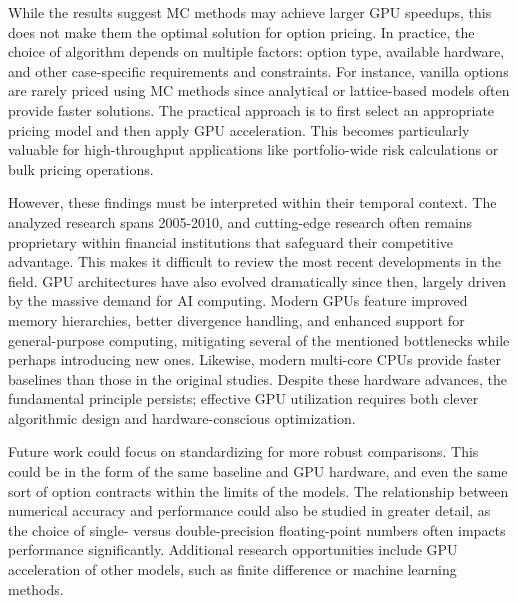\documentclass[english,12pt,a4paper,pdftex,sci,utf8]{aaltothesis}
\begin{document}
While the results suggest MC methods may achieve larger GPU speedups, this does not make them the optimal solution for option pricing. In practice, the choice of algorithm depends on multiple factors: option type, available hardware, and other case-specific requirements and constraints. For instance, vanilla options are rarely priced using MC methods since analytical or lattice-based models often provide faster solutions. The practical approach is to first select an appropriate pricing model and then apply GPU acceleration. This becomes particularly valuable for high-throughput applications like portfolio-wide risk calculations or bulk pricing operations.

However, these findings must be interpreted within their temporal context. The analyzed research spans 2005-2010, and cutting-edge research often remains proprietary within financial institutions that safeguard their competitive advantage. This makes it difficult to review the most recent developments in the field. GPU architectures have also evolved dramatically since then, largely driven by the massive demand for AI computing. Modern GPUs feature improved memory hierarchies, better divergence handling, and enhanced support for general-purpose computing, mitigating several of the mentioned bottlenecks while perhaps introducing new ones. Likewise, modern multi-core CPUs provide faster baselines than those in the original studies. Despite these hardware advances, the fundamental principle persists; effective GPU utilization requires both clever algorithmic design and hardware-conscious optimization.

Future work could focus on standardizing for more robust comparisons. This could be in the form of the same baseline and GPU hardware, and even the same sort of option contracts within the limits of the models. The relationship between numerical accuracy and performance could also be studied in greater detail, as the choice of single- versus double-precision floating-point numbers often impacts performance significantly.
Additional research opportunities include GPU acceleration of other models, such as finite difference or machine learning methods.
\end{document}
